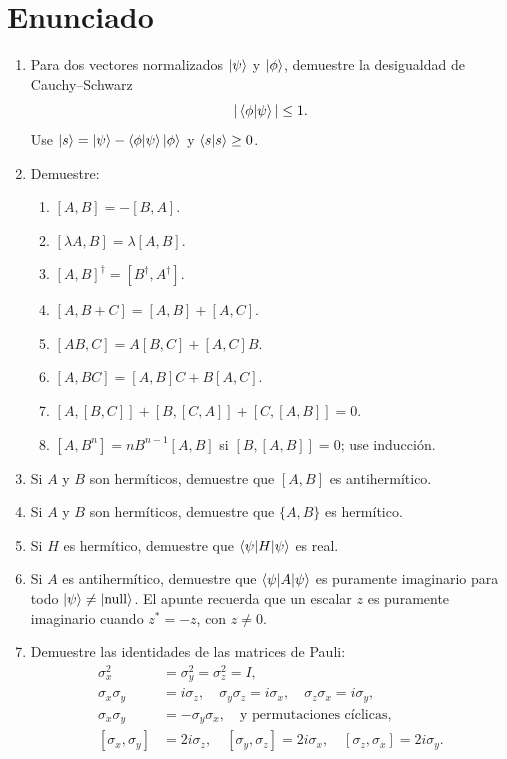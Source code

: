 \documentclass[11pt,a4paper]{article}
\numberwithin{equation}{section}
\begin{document}
\section*{Enunciado}
\begin{enumerate}[label=\arabic*.-]
\item Para dos vectores normalizados $\ket\psi$ y $\ket\phi$, demuestre la desigualdad de Cauchy--Schwarz
\begin{equation}|\braket{\phi|\psi}|\le1.\end{equation}
Use $\ket s=\ket\psi-\braket{\phi|\psi}\ket\phi$ y $\braket{s|s}\ge0$.
\item Demuestre:
\begin{enumerate}[label=\alph*)]
\item $[A,B]=-[B,A]$.
\item $[\lambda A,B]=\lambda[A,B]$.
\item $[A,B]^\dagger=[B^\dagger,A^\dagger]$.
\item $[A,B+C]=[A,B]+[A,C]$.
\item $[AB,C]=A[B,C]+[A,C]B$.
\item $[A,BC]=[A,B]C+B[A,C]$.
\item $[A,[B,C]]+[B,[C,A]]+[C,[A,B]]=0$.
\item $[A,B^n]=nB^{n-1}[A,B]$ si $[B,[A,B]]=0$; use inducción.
\end{enumerate}
\item Si $A$ y $B$ son hermíticos, demuestre que $[A,B]$ es antihermítico.
\item Si $A$ y $B$ son hermíticos, demuestre que $\{A,B\}$ es hermítico.
\item Si $H$ es hermítico, demuestre que $\braket{\psi|H|\psi}$ es real.
\item Si $A$ es antihermítico, demuestre que $\braket{\psi|A|\psi}$ es puramente imaginario para todo $\ket\psi\neq\ket{\mathrm{null}}$. El apunte recuerda que un escalar $z$ es puramente imaginario cuando $z^*=-z$, con $z\neq0$.
\item Demuestre las identidades de las matrices de Pauli:
\begin{align}
\sigma_x^2&=\sigma_y^2=\sigma_z^2=I,\\
\sigma_x\sigma_y&=i\sigma_z,\quad \sigma_y\sigma_z=i\sigma_x,\quad \sigma_z\sigma_x=i\sigma_y,\\
\sigma_x\sigma_y&=-\sigma_y\sigma_x,\quad\text{y permutaciones cíclicas},\\
[\sigma_x,\sigma_y]&=2i\sigma_z,\quad[\sigma_y,\sigma_z]=2i\sigma_x,\quad[\sigma_z,\sigma_x]=2i\sigma_y.

\end{align}
\end{enumerate}
\end{document}
